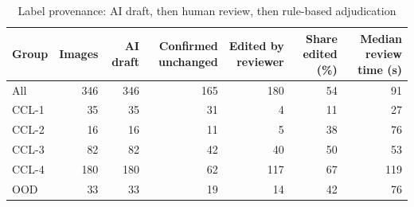 \begin{table}[t]
\centering
\caption{Label provenance: AI draft, then human review, then rule-based adjudication}
\label{tab:provenance}
\small
\begin{tabular}{lrrrrrr}
\toprule
Group & Images & AI draft & Confirmed unchanged & Edited by reviewer & Share edited (\%) & Median review time (s) \\
\midrule
All & 346 & 346 & 165 & 180 & 54 & 91 \\
CCL-1 & 35 & 35 & 31 & 4 & 11 & 27 \\
CCL-2 & 16 & 16 & 11 & 5 & 38 & 76 \\
CCL-3 & 82 & 82 & 42 & 40 & 50 & 53 \\
CCL-4 & 180 & 180 & 62 & 117 & 67 & 119 \\
OOD & 33 & 33 & 19 & 14 & 42 & 76 \\
\bottomrule
\end{tabular}
\par{}
\end{table}
